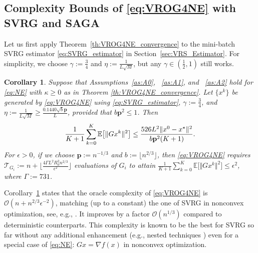 \documentclass{article}
\newcommand{\sets}[1]{\{#1\}}
\newcommand{\norms}[1]{\Vert#1\Vert}
\newcommand{\Expk}[1]{\mathbb{E}\big[#1\big]}
\newcommand{\Tc}{\mathcal{T}}
\newcommand{\BigO}[1]{\mathcal{O}\left(#1\right)}
\newcommand{\mbf}[1]{\mathbf{#1}}
\newcommand{\beforesubsec}{\vspace{-1.5ex}}
\newcommand{\aftersubsec}{\vspace{-1.5ex}}
\theoremstyle{plain}
\newtheorem{corollary}[theorem]{Corollary}
\theoremstyle{definition}
\theoremstyle{remark}
\begin{document}
\vspace{-0.25ex}
\beforesubsec
\subsection{Complexity Bounds of \ref{eq:VROG4NE} with SVRG and SAGA}\label{subsec:Oracle_complexity}
\aftersubsec
\vspace{0.3ex}
Let us first apply Theorem~\ref{th:VROG4NE_convergence} to the mini-batch SVRG estimator \eqref{eq:SVRG_estimator} in Section~\ref{sec:VRS_Estimator}.
For simplicity, we choose $\gamma := \frac{3}{4}$ and $\eta := \frac{1}{L\sqrt{M}}$, but any $\gamma \in \left(\frac{1}{2}, 1\right)$ still works.

\begin{corollary}\label{co:SVRG_convergence1_v2}
Suppose that Assumptions~\ref{as:A0}, ~\ref{as:A1}, and ~\ref{as:A2} hold for \eqref{eq:NE} with $\kappa \geq 0$ as in Theorem \ref{th:VROG4NE_convergence}.
Let $\sets{x^k}$ be generated by \eqref{eq:VROG4NE} using \eqref{eq:SVRG_estimator}, $\gamma := \frac{3}{4}$, and $\eta := \frac{1}{L\sqrt{M}} \geq \frac{0.1440 \sqrt{b}\mbf{p}}{L}$, provided that $b\mbf{p}^2 \leq 1$.  
Then 
\vspace{-0.75ex}
\begin{equation}\label{eq:SFP_convergence_bound_v2}
\frac{1}{K+1}\sum_{k=0}^{K} \Expk{ \norms{Gx^k}^2 }   \leq     \frac{526 L^2  \norms{x^0 - x^{\star}}^2 }{ b\mbf{p}^2 (K + 1)}.
\vspace{-0.5ex}
\end{equation}
For $\epsilon > 0$, if we choose $\mbf{p} :=  n^{-1/3}$ and $b := \lfloor n^{2/3} \rfloor$, then \eqref{eq:VROG4NE} requires $\Tc_{G_i} := n + \big\lfloor \frac{4\Gamma  L^2R_0^2 n^{2/3} }{\epsilon^2} \big\rfloor$ evaluations of $G_i$ to attain $\frac{1}{K+1}\sum_{k=0}^{K} \Expk{ \norms{Gx^k}^2 } \leq \epsilon^2$, where $\Gamma := 731$.
\end{corollary}

Corollary~\ref{co:SVRG_convergence1_v2} states that the oracle complexity of \eqref{eq:VROG4NE} is $\BigO{n + n^{2/3}\epsilon^{-2}}$, matching  (up to a constant) the one of SVRG in nonconvex optimization, see, e.g., \cite{allen2016variance,Reddi2016a}.
It improves by a factor $\BigO{n^{1/3}}$ compared to deterministic counterparts.
This complexity is known to be the best for SVRG so far without any additional enhancement (e.g., nested techniques \citep{zhou2018stochastic}) even for a special case of \eqref{eq:NE}: $Gx = \nabla{f}(x)$ in nonconvex optimization.
\end{document}
